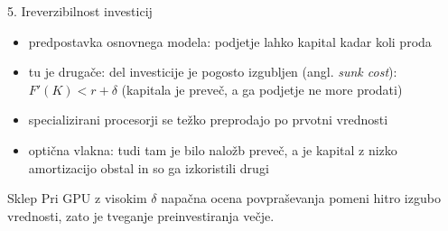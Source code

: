 \documentclass[aspectratio=169,11pt]{beamer}
\begin{document}
\begin{frame}{5. Ireverzibilnost investicij}
\begin{itemize}
\item predpostavka osnovnega modela: podjetje lahko kapital kadar koli proda
\item tu je drugače: del investicije je pogosto izgubljen (angl. \textit{sunk cost}): $F'(K) < r + \delta$ (kapitala je preveč, a ga podjetje ne more prodati)
\item specializirani procesorji se težko preprodajo po prvotni vrednosti
\item optična vlakna: tudi tam je bilo naložb preveč, a je kapital z nizko amortizacijo obstal in so ga izkoristili drugi
\end{itemize}
\begin{alertblock}{Sklep}
Pri GPU z visokim $\delta$ napačna ocena povpraševanja pomeni hitro izgubo vrednosti, zato je tveganje preinvestiranja večje.
\end{alertblock}
\end{frame}


\end{document}
